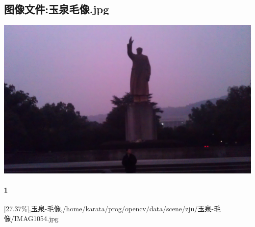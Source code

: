 \subsection{图像文件:玉泉毛像.jpg}
\includegraphics[width=15cm,angle=0]{玉泉毛像.jpg}

\paragraph{1}
[27.37\%],玉泉-毛像,/home/karata/prog/opencv/data/scene/zju/玉泉-毛像/IMAG1054.jpg

